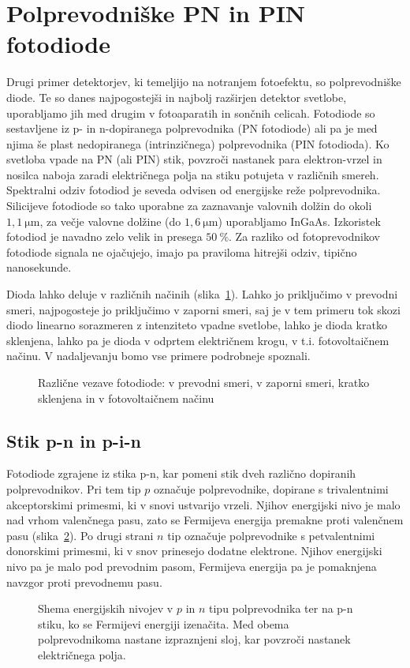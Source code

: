 \section{Polprevodniške PN in PIN fotodiode}
Drugi primer detektorjev, ki temeljijo na notranjem fotoefektu, so polprevodniške diode.
Te so danes najpogostejši in najbolj razširjen detektor svetlobe, uporabljamo jih med
drugim v fotoaparatih in sončnih celicah. Fotodiode so sestavljene iz p- in n-dopiranega 
polprevodnika (PN fotodiode) ali pa je med njima še plast nedopiranega (intrinzičnega) polprevodnika 
(PIN fotodioda). Ko svetloba vpade na PN (ali PIN) stik,
povzroči nastanek para elektron-vrzel in nosilca naboja zaradi električnega polja na stiku potujeta 
v različnih smereh. Spektralni odziv fotodiod je seveda odvisen od energijske reže polprevodnika. 
Silicijeve fotodiode so tako uporabne za zaznavanje valovnih dolžin do okoli $1,1~\si{\micro\meter}$, za
večje valovne dolžine (do $1,6~\si{\micro\meter}$) uporabljamo InGaAs. Izkoristek fotodiod
je navadno zelo velik in presega $50~\%$. Za razliko od fotoprevodnikov fotodiode signala
ne ojačujejo, imajo pa praviloma hitrejši odziv, tipično nanosekunde.

Dioda lahko deluje v različnih načinih (slika~\ref{11_PD}). 
Lahko jo priključimo v prevodni smeri, najpogosteje jo priključimo v zaporni smeri, saj je v
tem primeru tok skozi diodo linearno sorazmeren z intenziteto vpadne svetlobe, lahko 
je dioda kratko sklenjena, lahko pa je dioda v odprtem električnem krogu, v t.i. fotovoltaičnem 
načinu. V nadaljevanju bomo vse primere podrobneje spoznali.
\begin{figure}[h]
\centering
\def\svgwidth{140truemm} 

\caption{Različne vezave fotodiode: v prevodni smeri, v zaporni smeri, kratko sklenjena in 
v fotovoltaičnem načinu}
\label{11_PD}
\end{figure}

\subsection*{Stik p-n in p-i-n}
Fotodiode zgrajene iz stika p-n, kar pomeni stik dveh različno dopiranih polprevodnikov. 
Pri tem tip $p$ označuje
polprevodnike, dopirane s trivalentnimi akceptorskimi primesmi, ki v snovi ustvarijo vrzeli.
Njihov energijski nivo je malo nad vrhom valenčnega pasu, zato se Fermijeva energija
premakne proti valenčnem pasu (slika~\ref{11_PN1}). 
Po drugi strani $n$ tip označuje polprevodnike s petvalentnimi 
donorskimi primesmi, ki v snov prinesejo dodatne elektrone. Njihov energijski nivo pa je malo 
pod prevodnim pasom, Fermijeva energija pa je pomaknjena navzgor proti prevodnemu pasu.
\begin{figure}[h]
\centering
\def\svgwidth{140truemm} 

\caption{Shema energijskih nivojev v $p$ in $n$ tipu polprevodnika ter na p-n stiku, ko se
Fermijevi energiji izenačita. Med obema polprevodnikoma nastane izpraznjeni sloj, kar 
povzroči nastanek električnega polja.}
\label{11_PN1}
\end{figure}

